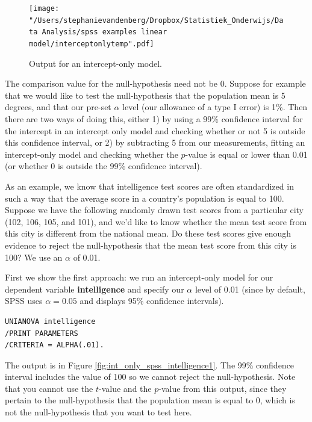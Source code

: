 \documentclass[]{book}\usepackage[]{graphicx}\usepackage[]{color}
\begin{document}
\begin{figure}[h!]
    \begin{center}
       \texttt{[image: "/Users/stephanievandenberg/Dropbox/Statistiek\_Onderwijs/Data Analysis/spss examples linear model/interceptonlytemp".pdf]}
    \end{center}
    \caption{Output for an intercept-only model.}
    \label{fig:int_only_spss}
\end{figure}

The comparison value for the null-hypothesis need not be 0. Suppose for example that we would like to test the null-hypothesis that the population mean is 5 degrees, and that our pre-set $\alpha$ level (our allowance of a type I error) is 1\%. Then there are two ways of doing this, either 1) by using a 99\% confidence interval for the intercept in an intercept only model and checking whether or not 5 is outside this confidence interval, or 2) by subtracting 5 from our measurements, fitting an intercept-only model and checking whether the $p$-value is equal or lower than 0.01 (or whether 0 is outside the 99\% confidence interval). 

As an example, we know that intelligence test scores are often standardized in such a way that the average score in a country's population is equal to 100. Suppose we have the following randomly drawn test scores from a particular city (102, 106, 105, and 101), and we'd like to know whether the mean test score from this city is different from the national mean. Do these test scores give enough evidence to reject the null-hypothesis that the mean test score from this city is 100? We use an $\alpha$ of 0.01. 

First we show the first approach: we run an intercept-only model for our dependent variable \textbf{intelligence} and specify our $\alpha$ level of 0.01 (since by default, SPSS uses $\alpha = 0.05$ and displays 95\% confidence intervals). 

\begin{verbatim}
UNIANOVA intelligence 
/PRINT PARAMETERS
/CRITERIA = ALPHA(.01).
\end{verbatim}

The output is in Figure \ref{fig:int_only_spss_intelligence1}. The 99\% confidence interval includes the value of 100 so we cannot reject the null-hypothesis. Note that you cannot use the $t$-value and the $p$-value from this output, since they pertain to the null-hypothesis that the population mean is equal to 0, which is not the null-hypothesis that you want to test here. 
 
\end{document}
